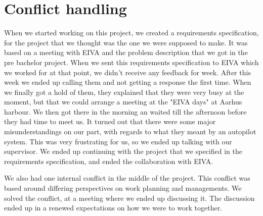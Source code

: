 \chapter{Conflict handling}
When we started working on this project, we created a requirements specification, for the project that we thought was the one we were supposed to make. It was based on a meeting with EIVA and the problem description that we got in the pre bachelor project. When we sent this requirements specification to EIVA which we worked for at that point, we didn't receive any feedback for week. After this week we ended up calling them and not getting a response the first time. When we finally got a hold of them, they explained that they were very busy at the moment, but that we could arrange a meeting at the "EIVA days" at Aarhus harbour. We then got there in the morning an waited till the afternoon before they had time to meet us. It turned out that there were some major misunderstandings on our part, with regards to what they meant by an autopilot system. This was very frustrating for us, so we ended up talking with our supervisor. We ended up continuing with the project that we specified in the requirements specification, and ended the collaboration with EIVA. 

We also had one internal conflict in the middle of the project. This conflict was based around differing perspectives on work planning and managements. We solved the conflict, at a meeting where we ended up discussing it. The discussion ended up in a renewed expectations on how we were to work together.

